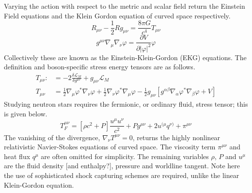 \documentclass[11pt, oneside]{report}  %
\newcommand{\vp}{\varphi}
\numberwithin{equation}{section}
\begin{document}
Varying the action with respect to the metric and scalar field return the Einstein Field equations and the Klein Gordon equation of curved space respectively.
\begin{equation} R_{\mu\nu} - \frac{1}{2}R g_{\mu\nu} =  \frac{8\pi G}{c^4} T_{\mu\nu}  \end{equation}
\begin{equation}  g^{\mu\nu}\nabla_\mu\nabla_\nu \vp = \frac{\partial V}{\partial |\vp|^2}\vp \end{equation}
Collectively these are known as the Einstein-Klein-Gordon (EKG) equations. The definition and boson-specific stress energy tensors are as follows.
\begin{align}  
T_{\mu\nu} :&= -2\frac{\delta \mathcal{L}_{M}}{\delta g^{\mu\nu}}+g_{\mu\nu}\mathcal{L}_M \\
T_{\mu\nu} &= \frac{1}{2}\nabla_{\mu}\varphi^*\nabla_{\nu}\varphi+\frac{1}{2}\nabla_{\nu}\varphi^*\nabla_{\mu}\varphi-\frac{1}{2}g_{\mu\nu}\left[g^{\alpha\beta}\nabla_\alpha\varphi^*\nabla_\beta\varphi + V\right] 
\end{align}
Studying neutron stars requires the fermionic, or ordinary fluid, stress tensor; this is given below.
\begin{equation} T^{\mu\nu}_F = \left[\rho c^2+ {P} \right]\frac{u^\mu u^\nu}{c^2} + P g^{\mu\nu} + 2u^{(\mu}q^{\nu)}+\pi^{\mu\nu}\end{equation} 
The vanishing of the divergence, $\nabla_\nu T^{\mu\nu}=0 $, returns the highly nonlinear relativistic Navier-Stokes equations of curved space. The viscosity term $\pi^{\mu\nu}$ and heat flux $q^\mu$ are often omitted for simplicity. The remaining variables $\rho$, $P$ and $u^\mu$ are the fluid density [and enthalpy?], pressure and worldline tangent. Note here the use of sophisticated shock capturing schemes are required, unlike the linear Klein-Gordon equation.
\end{document}
